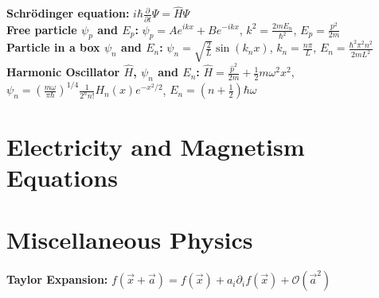 \documentclass[12pt]{extarticle}
\begin{document}
\textbf{Schr\"odinger equation:} $i\hbar\frac{\partial}{\partial t} \Psi = \hat{H} \Psi$ \\
\textbf{Free particle $\psi_p$ and $E_p$:} $\psi_p = Ae^{ikx}+Be^{-ikx}$, $k^2=\frac{2mE_n}{\hbar^2}$, $E_p = \frac{p^2}{2m}$ \\
\textbf{Particle in a box $\psi_n$ and $E_n$:} $\psi_n = \sqrt{\frac{2}{L}}\sin{(k_nx)}$, $k_n = \frac{n\pi}{L}$, $E_n = \frac{\hbar^2\pi^2n^2}{2mL^2}$ \\
\textbf{Harmonic Oscillator $\hat{H}$, $\psi_n$ and $E_n$:} $\hat{H} = \frac{\hat{p}^2}{2m} + \frac{1}{2}m\omega^2x^2$, $\psi_n = \left(\frac{m\omega}{\pi\hbar}\right)^{1/4}\frac{1}{2^nn!}H_n(x)e^{-x^2/2}$, $E_n = (n+\frac{1}{2})\hbar\omega$ \\

\section{Electricity and Magnetism Equations}

\section{Miscellaneous Physics}
\textbf{Taylor Expansion:} $f(\vec{x}+\vec{a}) = f(\vec{x}) + a_i\partial_i f(\vec{x}) + \mathcal{O}(\vec{a}^2)$
\end{document}
